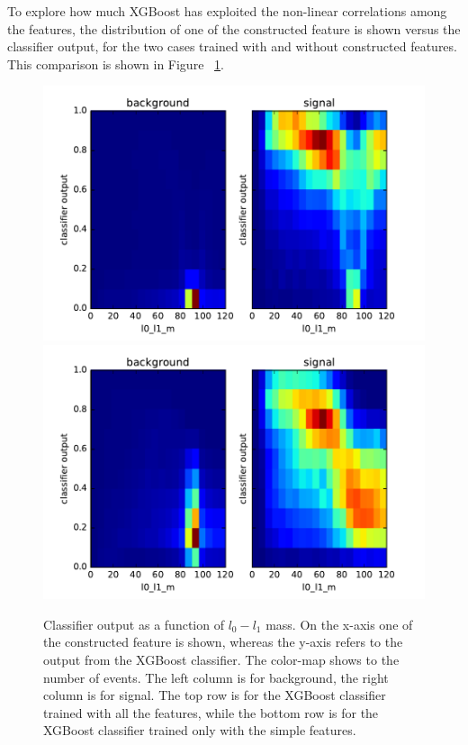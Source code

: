 \documentclass{article}
\begin{document}
To explore how much XGBoost has exploited the non-linear correlations among the features, the distribution of one of the constructed feature is shown versus the classifier output, for the two cases trained with and without constructed features. This comparison is shown in Figure ~\ref{fig:roc_curve_lowlevel}.
\begin{figure}[!h]
  \label{fig:roc_curve_lowlevel}
  \centering
  \includegraphics[width=\columnwidth]{l0_l1_m_highlevel.pdf}
  \includegraphics[width=\columnwidth]{l0_l1_m_lowlevel.pdf}
  \caption{Classifier output as a function of $l_0-l_1$ mass. On the x-axis one of the constructed feature is shown, whereas the y-axis refers to the output from the XGBoost classifier. The color-map shows to the number of events. The left column is for background, the right column is for signal. The top row is for the XGBoost classifier trained with all the features, while the bottom row is for the XGBoost classifier trained only with the simple features.}
\end{figure}
\end{document}
